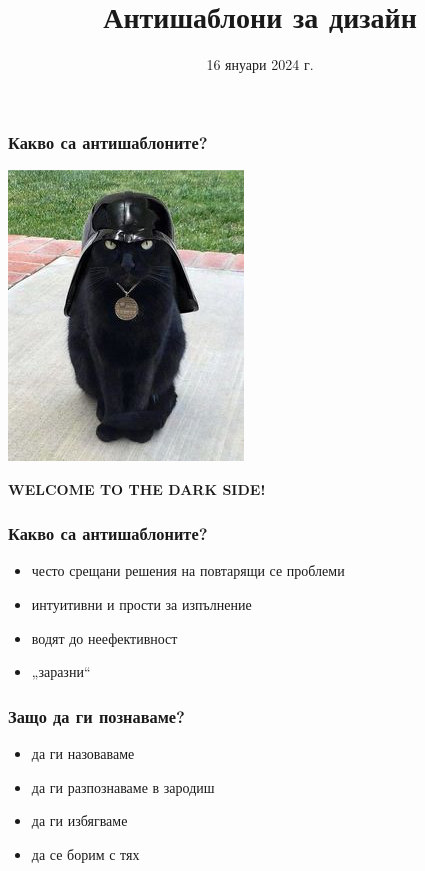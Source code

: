 \documentclass[alsotrans]{beamerswitch}
\title{Антишаблони за дизайн}
\date{16 януари 2024 г.}
\begin{document}
\begin{frame}
  \titlepage
\end{frame}

\begin{frame}
  \frametitle{Какво са антишаблоните?}

  \begin{center}
    \includegraphics[height=.7\textheight]{catvader.jpg}
    
    \LARGE \textbf{WELCOME TO THE DARK SIDE!}
  \end{center}
\end{frame}

\begin{frame}
  \frametitle{Какво са антишаблоните?}

  \begin{itemize}
  \item често срещани решения на повтарящи се проблеми
  \item интуитивни и прости за изпълнение
  \item водят до неефективност
  \item „заразни“
  \end{itemize}
\end{frame}

\begin{frame}
  \frametitle{Защо да ги познаваме?}

  \begin{itemize}
  \item да ги назоваваме
  \item да ги разпознаваме в зародиш
  \item да ги избягваме
  \item да се борим с тях
  \end{itemize}
\end{frame}
\end{document}
